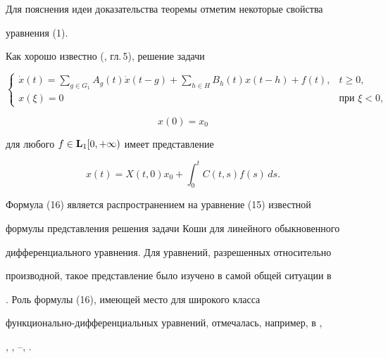 Для пояснения идеи доказательства теоремы отметим некоторые свойства


уравнения (1).





Как хорошо известно (\cite{Az1}, гл.\,5), решение задачи


%


\begin{equation}


\begin{cases}


\Dot x(t)=\sum\limits_{g\in G_1}A_g(t)\Dot x(t-g)+


\sum\limits_{h\in H}B_h(t)x(t-h)+f(t), & t\ge0 ,\\


%


x(\xi)=0 & \text{при }\xi<0,


\end{cases}


\end{equation}


%


$$


x(0)=x_0


$$


для любого $f\in\bold L_1[0,+\infty)$ имеет представление


%


\begin{equation}


x(t)=X(t,0)x_0+\int_0^tC(t,s)f(s)\,ds.


\end{equation}


%





Формула (16) является распространением на уравнение (15) известной


формулы представления решения задачи Коши для линейного обыкновенного


дифференциального уравнения. Для уравнений, разрешенных относительно


производной, такое представление было изучено в самой общей ситуации в


\cite{Mak}. Роль формулы (16), имеющей место для широкого класса


функционально-дифференциальных уравнений, отмечалась, например, в \cite{Hale},


\cite{Kol}, \cite{Ku3}, \cite{Az1}--\cite{Mal}, \cite{Mak}.


